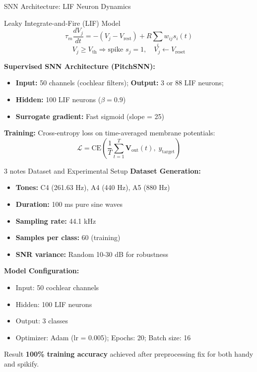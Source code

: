 \documentclass[aspectratio=169,20pt]{beamer}
\newcommand{\vect}[1]{\mathbf{#1}}
\begin{document}
\begin{frame}{SNN Architecture: LIF Neuron Dynamics}
\begin{block}{Leaky Integrate-and-Fire (LIF) Model}
\begin{equation}
\tau_m \frac{dV_j}{dt} = -(V_j - V_{\text{rest}}) + R \sum_i w_{ij} s_i(t)
\end{equation}
\begin{equation}
V_j \geq V_{\text{th}} \Rightarrow \text{spike } s_j = 1, \quad V_j \leftarrow V_{\text{reset}}
\end{equation}
\end{block}

\vfill
\textbf{Supervised SNN Architecture (PitchSNN):}
\begin{itemize}
    \item \textbf{Input:} 50 channels (cochlear filters); \textbf{Output:} 3 or 88 LIF neurons;
    \item \textbf{Hidden:} 100 LIF neurons ($\beta = 0.9$)
    \item \textbf{Surrogate gradient:} Fast sigmoid (slope = 25)
\end{itemize}

\vfill
\textbf{Training:} Cross-entropy loss on time-averaged membrane potentials:
\begin{equation}
\mathcal{L} = \text{CE}\left(\frac{1}{T}\sum_{t=1}^{T} \vect{V}_{\text{out}}(t), \; y_{\text{target}}\right)
\end{equation}
\end{frame}

\begin{frame}{3 notes Dataset and Experimental Setup}
	\textbf{Dataset Generation:}
	\begin{itemize}
		\item \textbf{Tones:} C4 (261.63 Hz), A4 (440 Hz), A5 (880 Hz)
		\item \textbf{Duration:} 100 ms pure sine waves
		\item \textbf{Sampling rate:} 44.1 kHz
		\item \textbf{Samples per class:} 60 (training)
		\item \textbf{SNR variance:} Random 10-30 dB for robustness
	\end{itemize}
	
	\vspace{0.cm}
	\textbf{Model Configuration:}
	\begin{itemize}
		\item Input: 50 cochlear channels
		\item Hidden: 100 LIF neurons
		\item Output: 3 classes
		\item Optimizer: Adam (lr = 0.005); Epochs: 20; Batch size: 16
	\end{itemize}
	
	\vspace{0.3cm}
	\begin{block}{Result}
		\textbf{100\% training accuracy} achieved after preprocessing fix for both handy and spikify.
	\end{block}
\end{frame}
\end{document}

